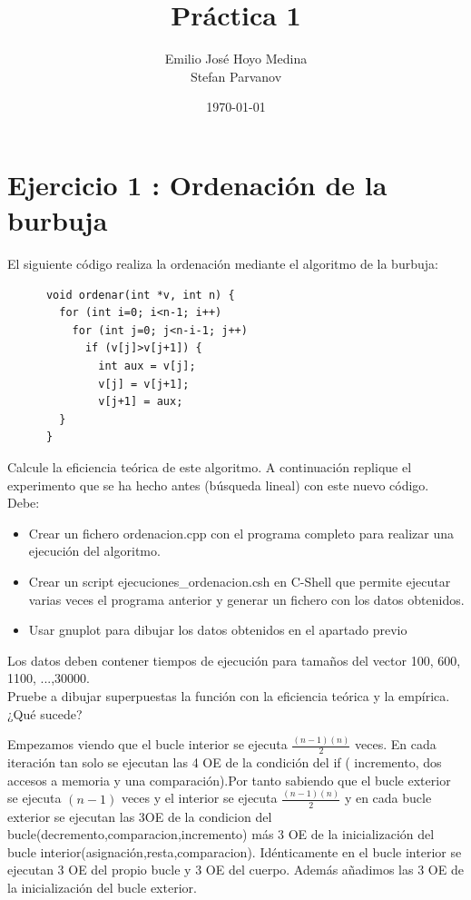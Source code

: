 \documentclass{article}
\begin{document}
\lstset{language=C++}
\lstset{numbers=left}

\title{Práctica 1}
\author{Emilio José Hoyo Medina\\ Stefan Parvanov}
\date{\today}
\maketitle

\section{Ejercicio 1 : Ordenación de la burbuja}
El siguiente código realiza la ordenación mediante el algoritmo de la burbuja:
\begin{lstlisting}
      void ordenar(int *v, int n) {
        for (int i=0; i<n-1; i++)
          for (int j=0; j<n-i-1; j++)
            if (v[j]>v[j+1]) {
              int aux = v[j];
              v[j] = v[j+1];
              v[j+1] = aux;
		} 
      }
\end{lstlisting}

Calcule la eficiencia teórica de este algoritmo. A continuación replique el experimento que se ha hecho antes (búsqueda lineal) con este nuevo código. Debe:
\begin{itemize}
	\item Crear un fichero ordenacion.cpp con el programa completo para realizar una ejecución del algoritmo.
	\item Crear un script ejecuciones\_ordenacion.csh en C-Shell que permite ejecutar varias veces el programa anterior y generar un fichero con los datos obtenidos.
	\item Usar gnuplot para dibujar los datos obtenidos en el apartado previo
\end{itemize}
Los datos deben contener tiempos de ejecución para tamaños del vector 100, 600, 1100, ...,30000. \\
Pruebe a dibujar superpuestas la función con la eficiencia teórica y la empírica. ¿Qué sucede? 
\clearpage


Empezamos viendo que el bucle interior se ejecuta $\frac{(n-1)(n)}{2}$ veces.
En cada iteraci\'on tan solo se ejecutan las 4 OE de la condici\'on del if ( incremento, dos accesos a memoria y una comparaci\'on).Por tanto sabiendo que el bucle exterior se ejecuta $(n-1)$ veces y el interior se ejecuta $\frac{(n-1)(n)}{2}$ y en cada bucle exterior se ejecutan las 3OE de la condicion del bucle(decremento,comparacion,incremento) m\'as 3 OE de la inicializaci\'on del bucle interior(asignaci\'on,resta,comparacion). Id\'enticamente en el bucle interior se ejecutan 3 OE del propio bucle y 3 OE del cuerpo. Adem\'as añadimos las 3 OE de la inicializaci\'on del bucle exterior.
\end{document}
